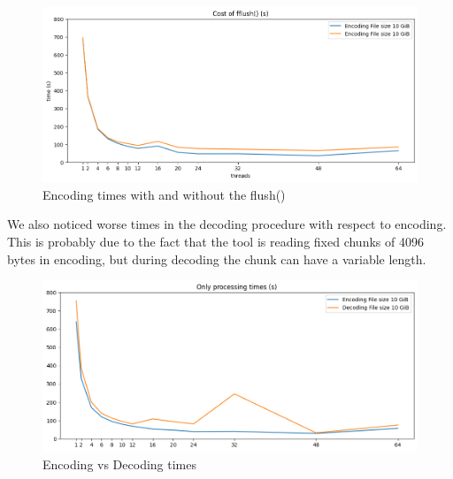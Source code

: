 \begin{figure}
	\centering
	\includegraphics[width=1\linewidth]{"../imgs/Flush vs non Flush"}
	\caption{Encoding times with and without the flush()}
	\label{fig:flush-vs-non-flush}
\end{figure}

We also noticed worse times in the decoding procedure with respect to encoding. This is probably due to the fact that the tool is reading fixed chunks of 4096 bytes in encoding, but during decoding the chunk can have a variable length.

\begin{figure}
	\centering
	\includegraphics[width=1\linewidth]{"../imgs/Encoding vs Decoding"}
	\caption{Encoding vs Decoding times}
	\label{fig:encoding-vs-decoding}
\end{figure}


